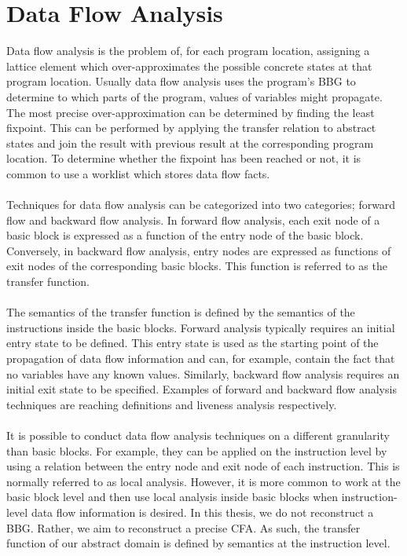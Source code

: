 \documentclass{kththesis}
\newcommand{\fbcomment}[1]{{#1}}
\renewcommand{\fbcomment}[1]{}
\begin{document}
\section{Data Flow Analysis}
\fbcomment{\color{red}Goal: Give the reader an understanding of the context of the CPA algorithm (The core worklist algorithm which which is based on theory from data flow analysis)}
Data flow analysis is the problem of, for each program location, assigning a lattice element which over-approximates the possible concrete states at that program location\cite{cpaAlgo}. Usually data flow analysis uses the program's BBG to determine to which parts of the program, values of variables might propagate. The most precise over-approximation can be determined by finding the least fixpoint. This can be performed by applying the transfer relation to abstract states and join the result with previous result at the corresponding program location. To determine whether the fixpoint has been reached or not, it is common to use a worklist which stores data flow facts\cite{cpaAlgo}.
\\ \\
Techniques for data flow analysis can be categorized into two categories; forward flow and backward flow analysis. In forward flow analysis, each exit node of a basic block is expressed as a function of the entry node of the basic block. Conversely, in backward flow analysis, entry nodes are expressed as functions of exit nodes of the corresponding basic blocks. This function is referred to as the transfer function.
\\ \\
The semantics of the transfer function is defined by the semantics of the instructions inside the basic blocks. Forward analysis typically requires an initial entry state to be defined. This entry state is used as the starting point of the propagation of data flow information and can, for example, contain the fact that no variables have any known values. Similarly, backward flow analysis requires an initial exit state to be specified. Examples of forward and backward flow analysis techniques are reaching definitions\cite{reachingDefinitions} and liveness analysis\cite{liveness} respectively.
\\ \\
It is possible to conduct data flow analysis techniques on a different granularity than basic blocks. For example, they can be applied on the instruction level by using a relation between the entry node and exit node of each instruction. This is normally referred to as local analysis\cite{carneigeDataFlow}. However, it is more common to work at the basic block level and then use local analysis inside basic blocks when instruction-level data flow information is desired\cite{carneigeDataFlow}. In this thesis, we do not reconstruct a BBG. Rather, we aim to reconstruct a precise CFA. As such, the transfer function of our abstract domain is defined by semantics at the instruction level. 
\end{document}
